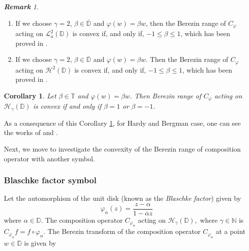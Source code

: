 \documentclass[12pt, reqno]{amsart}
\newtheorem{corollary}[theorem]{Corollary}
\theoremstyle{definition}
\theoremstyle{remark}
\newtheorem{remark}[theorem]{\bf{Remark}}
\numberwithin{equation}{section}
\begin{document}
\begin{remark}
	\begin{enumerate}
	\item[(i)]		If we choose $\gamma=2$, $\beta\in \overline{\mathbb{D}}$ and $\varphi(w)=\beta w$, then the Berezin range of $C_\varphi$ acting on $\mathcal{L}_a^2(\mathbb{D})$ is convex if, and only if, $-1\leq \beta\leq 1$, which has been proved in \cite{Augustine_Garayev_Shankar_CAOT_2023}.
		\item[(ii)] If we choose $\gamma=2$, $\beta\in \overline{\mathbb{D}}$ and $\varphi(w)=\beta w$. Then the Berezin range of $C_\varphi$ acting on $\mathcal{H}^2(\mathbb{D})$ is convex if, and only if, $-1\leq \beta\leq 1$, which has been proved in \cite{Augustine_Garayev_Shankar_CAOT_2023}.
		\end{enumerate}

\end{remark}

\begin{corollary}\label{Cor_4.5}
	Let $\beta\in \mathbb{T}$ and $\varphi(w)=\beta w$. Then Berezin range of $C_\varphi$ acting on $\mathcal{H}_\gamma(\mathbb{D})$ is convex if and only if $ \beta= 1$ or $ \beta=-1$.
\end{corollary}

As a consequence of this Corollary \ref{Cor_4.5}, for Hardy and Bergman case, one can see the works of \cite[Theorem 4.1]{CowenFelder} and \cite[Corollary 5.2]{Augustine_Garayev_Shankar_CAOT_2023}. 


Next, we move to investigate the convexity of the Berezin range of composition operator with another symbol.

\subsubsection{\bf Blaschke factor symbol}
Let the automorphism of the unit disk (known as the {\it Blaschke factor}) given by
\begin{equation}\label{eq:blaschke_factor}
    \varphi_\alpha (z)=\dfrac{z-\alpha}{1-\overline{\alpha}z}
\end{equation}
where $\alpha \in \mathbb{D}$. 
The composition operator $C_{\varphi_\alpha}$  acting on $\mathcal{H}_\gamma(\mathbb{D}),$ where $\gamma\in \mathbb{N}$ is $C_{\varphi_\alpha}f=f \circ\varphi_\alpha$.
The Berezin transform of the composition operator $C_{\varphi_\alpha}$ at a point $w\in \mathbb{D}$ is given by
\end{document}
